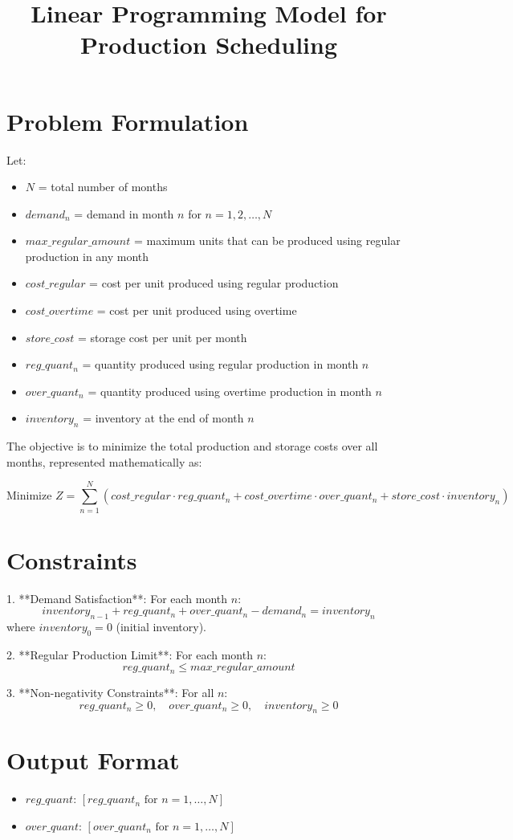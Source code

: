 \documentclass{article}
\begin{document}
\title{Linear Programming Model for Production Scheduling}
\author{}
\date{}
\maketitle

\section*{Problem Formulation}

Let:
\begin{itemize}
    \item $N$ = total number of months
    \item $demand_n$ = demand in month $n$ for $n = 1, 2, \ldots, N$
    \item $max\_regular\_amount$ = maximum units that can be produced using regular production in any month
    \item $cost\_regular$ = cost per unit produced using regular production
    \item $cost\_overtime$ = cost per unit produced using overtime
    \item $store\_cost$ = storage cost per unit per month
    \item $reg\_quant_n$ = quantity produced using regular production in month $n$
    \item $over\_quant_n$ = quantity produced using overtime production in month $n$
    \item $inventory_n$ = inventory at the end of month $n$
\end{itemize}

The objective is to minimize the total production and storage costs over all months, represented mathematically as:

\[
\text{Minimize } Z = \sum_{n=1}^{N} \left( cost\_regular \cdot reg\_quant_n + cost\_overtime \cdot over\_quant_n + store\_cost \cdot inventory_n \right)
\]

\section*{Constraints}

1. **Demand Satisfaction**:
   For each month \( n \):
   \[
   inventory_{n-1} + reg\_quant_n + over\_quant_n - demand_n = inventory_n
   \]
   where \( inventory_0 = 0 \) (initial inventory).

2. **Regular Production Limit**:
   For each month \( n \):
   \[
   reg\_quant_n \leq max\_regular\_amount
   \]

3. **Non-negativity Constraints**:
   For all \( n \):
   \[
   reg\_quant_n \geq 0, \quad over\_quant_n \geq 0, \quad inventory_n \geq 0
   \]

\section*{Output Format}

\begin{itemize}
    \item $reg\_quant$: $[reg\_quant_n \text{ for } n = 1, \ldots, N]$
    \item $over\_quant$: $[over\_quant_n \text{ for } n = 1, \ldots, N]$
\end{itemize}
\end{document}

